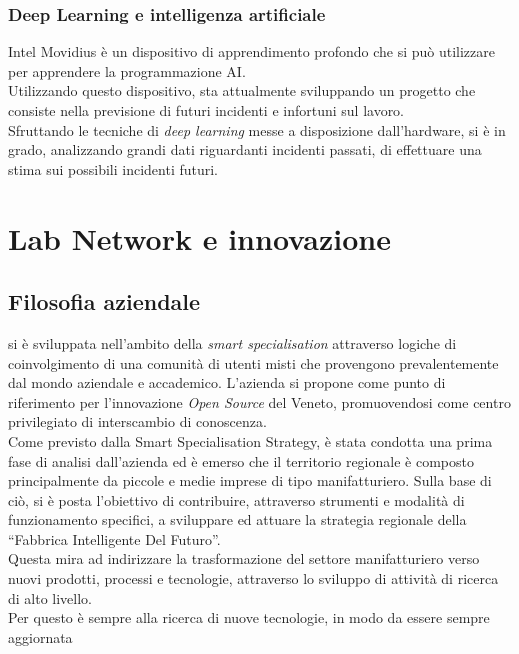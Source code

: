 \subsubsection{Deep Learning e intelligenza artificiale}
Intel Movidius è un dispositivo di apprendimento profondo che si può utilizzare per apprendere la programmazione AI.\\
Utilizzando questo dispositivo, \lab{} sta attualmente sviluppando un progetto che consiste nella previsione di futuri incidenti e infortuni sul lavoro.\\
Sfruttando le tecniche di \textit{deep learning} messe a disposizione dall'hardware, si è in grado, analizzando grandi dati riguardanti incidenti passati, di effettuare una stima sui possibili incidenti futuri.
\section{Lab Network e innovazione}
\subsection{Filosofia aziendale}
\lab{} si è sviluppata nell'ambito della \textit{smart specialisation} attraverso logiche di coinvolgimento di una comunità di utenti misti che provengono prevalentemente dal mondo aziendale e accademico. 
L'azienda si propone come punto di riferimento per l'innovazione \textit{Open Source} del Veneto, promuovendosi come centro privilegiato di interscambio di conoscenza.\\
Come previsto dalla Smart Specialisation Strategy, è stata condotta una prima fase di analisi dall'azienda ed è emerso che il territorio regionale è composto principalmente da piccole e medie imprese di tipo manifatturiero. Sulla base di ciò, \lab{} si è posta l'obiettivo di contribuire, attraverso strumenti e modalità di funzionamento specifici, a sviluppare ed attuare la strategia regionale della ``Fabbrica Intelligente Del Futuro''.\\
Questa mira ad indirizzare la trasformazione del settore manifatturiero verso nuovi prodotti, processi e tecnologie, attraverso lo sviluppo di attività di ricerca di alto livello.\\
Per questo \lab{} è sempre alla ricerca di nuove tecnologie, in modo da essere sempre aggiornata 

